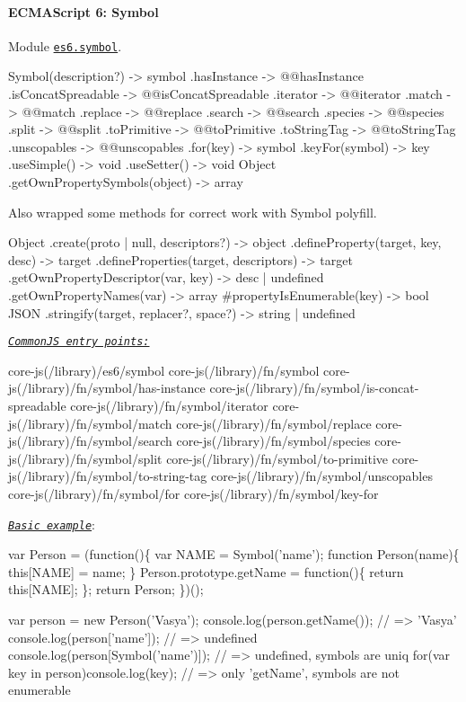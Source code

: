 \paragraph*{E\+C\+M\+A\+Script 6\+: Symbol}

Module \href{https://github.com/zloirock/core-js/blob/v2.6.0/modules/es6.symbol.js}{\tt {\ttfamily es6.\+symbol}}. 
\begin{DoxyCode}
Symbol(description?)  -> symbol
  .hasInstance        -> @@hasInstance
  .isConcatSpreadable -> @@isConcatSpreadable
  .iterator           -> @@iterator
  .match              -> @@match
  .replace            -> @@replace
  .search             -> @@search
  .species            -> @@species
  .split              -> @@split
  .toPrimitive        -> @@toPrimitive
  .toStringTag        -> @@toStringTag
  .unscopables        -> @@unscopables
  .for(key)           -> symbol
  .keyFor(symbol)     -> key
  .useSimple()        -> void
  .useSetter()        -> void
Object
  .getOwnPropertySymbols(object) -> array
\end{DoxyCode}
 Also wrapped some methods for correct work with {\ttfamily Symbol} polyfill. 
\begin{DoxyCode}
Object
  .create(proto | null, descriptors?)    -> object
  .defineProperty(target, key, desc)     -> target
  .defineProperties(target, descriptors) -> target
  .getOwnPropertyDescriptor(var, key)    -> desc | undefined
  .getOwnPropertyNames(var)              -> array
  #propertyIsEnumerable(key)             -> bool
JSON
  .stringify(target, replacer?, space?) -> string | undefined
\end{DoxyCode}
 \href{#commonjs}{\tt {\itshape Common\+JS entry points\+:}} 
\begin{DoxyCode}
core-js(/library)/es6/symbol
core-js(/library)/fn/symbol
core-js(/library)/fn/symbol/has-instance
core-js(/library)/fn/symbol/is-concat-spreadable
core-js(/library)/fn/symbol/iterator
core-js(/library)/fn/symbol/match
core-js(/library)/fn/symbol/replace
core-js(/library)/fn/symbol/search
core-js(/library)/fn/symbol/species
core-js(/library)/fn/symbol/split
core-js(/library)/fn/symbol/to-primitive
core-js(/library)/fn/symbol/to-string-tag
core-js(/library)/fn/symbol/unscopables
core-js(/library)/fn/symbol/for
core-js(/library)/fn/symbol/key-for
\end{DoxyCode}
 \href{http://goo.gl/BbvWFc}{\tt {\itshape Basic example}}\+: 
\begin{DoxyCode}
var Person = (function()\{
  var NAME = Symbol('name');
  function Person(name)\{
    this[NAME] = name;
  \}
  Person.prototype.getName = function()\{
    return this[NAME];
  \};
  return Person;
\})();

var person = new Person('Vasya');
console.log(person.getName());          // => 'Vasya'
console.log(person['name']);            // => undefined
console.log(person[Symbol('name')]);    // => undefined, symbols are uniq
for(var key in person)console.log(key); // => only 'getName', symbols are not enumerable
\end{DoxyCode}
